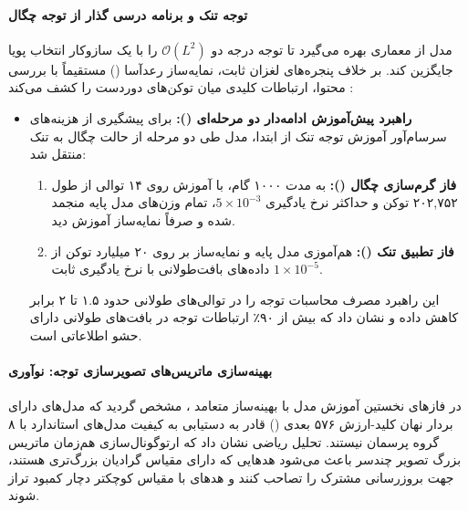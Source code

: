 \paragraph*{توجه تنک  و برنامه درسی گذار از توجه چگال}
مدل  از معماری  بهره می‌گیرد تا توجه درجه دو $\mathcal{O}(L^2)$ را با یک سازوکار انتخاب پویا جایگزین کند. بر خلاف پنجره‌های لغزان ثابت، نمایه‌ساز رعدآسا () مستقیماً با بررسی محتوا، ارتباطات کلیدی میان توکن‌های دوردست را کشف می‌کند \cite{zeng2026glm5}:
\begin{itemize}
    \item \textbf{راهبرد پیش‌آموزش ادامه‌دار دو مرحله‌ای ():} برای پیشگیری از هزینه‌های سرسام‌آور آموزش توجه تنک از ابتدا، مدل طی دو مرحله از حالت چگال به تنک منتقل شد:
    \begin{enumerate}
        \item \textbf{فاز گرم‌سازی چگال ():} به مدت ۱۰۰۰ گام، با آموزش روی ۱۴ توالی از طول ۲۰۲,۷۵۲ توکن و حداکثر نرخ یادگیری $5 \times 10^{-3}$، تمام وزن‌های مدل پایه منجمد شده و صرفاً نمایه‌ساز آموزش دید.
        \item \textbf{فاز تطبیق تنک ():} هم‌آموزی مدل پایه و نمایه‌ساز بر روی ۲۰ میلیارد توکن از داده‌های بافت‌طولانی با نرخ یادگیری ثابت $1 \times 10^{-5}$.
    \end{enumerate}
    این راهبرد مصرف محاسبات توجه را در توالی‌های طولانی حدود ۱.۵ تا ۲ برابر کاهش داده و نشان داد که بیش از ۹۰٪ ارتباطات توجه در بافت‌های طولانی دارای حشو اطلاعاتی است.
\end{itemize}

\paragraph*{بهینه‌سازی ماتریس‌های تصویرسازی توجه: نوآوری }
در فازهای نخستین آموزش مدل با بهینه‌ساز متعامد ، مشخص گردید که مدل‌های دارای بردار نهان کلید-ارزش ۵۷۶ بعدی () قادر به دستیابی به کیفیت مدل‌های استاندارد  با ۸ گروه پرسمان نیستند. تحلیل ریاضی نشان داد که ارتوگونال‌سازی هم‌زمان ماتریس بزرگ تصویر چندسر باعث می‌شود هدهایی که دارای مقیاس گرادیان بزرگ‌تری هستند، جهت بروزرسانی مشترک را تصاحب کنند و هدهای با مقیاس کوچکتر دچار کمبود تراز شوند.

